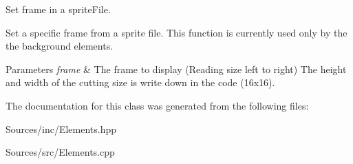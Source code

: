 Set frame in a sprite\+File. 

Set a specific frame from a sprite file. This function is currently used only by the the background elements. 
\begin{DoxyParams}{Parameters}
{\em frame} & The frame to display (Reading size left to right)  The height and width of the cutting size is write down in the code (16x16). \\
\hline
\end{DoxyParams}


The documentation for this class was generated from the following files\+:\begin{DoxyCompactItemize}
\item 
Sources/inc/Elements.\+hpp\item 
Sources/src/Elements.\+cpp\end{DoxyCompactItemize}

